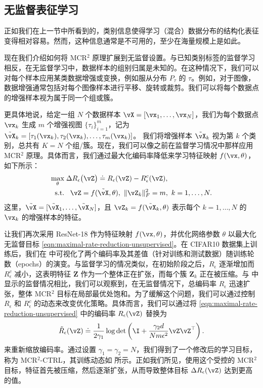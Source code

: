 \documentclass[../../book-main_zh.tex]{subfiles}
\begin{document}
\subsection{无监督表征学习}
\label{sec:SimDINO}

正如我们在上一节中所看到的，类别信息使得学习（混合）数据分布的结构化表征变得相对容易。然而，这种信息通常是不可用的，至少在海量规模上是如此。

现在我们介绍如何将 MCR$^2$ 原理扩展到无监督设置。与已知类别标签的监督学习相反，在无监督学习中，数据样本的组别归属是未知的。在这种情况下，我们可以对每个样本应用某类数据增强或变换，例如服从分布 $P_{\tau}$ 的 $\tau$。例如，对于图像，数据增强通常包括对每个图像样本进行平移、旋转或裁剪。我们可以将每个数据点的增强样本视为属于同一个组或簇。

更具体地说，给定一组 $N$ 个数据样本 $\vX =
[\vx_1,\dots,\vx_N]$，我们为每个数据点 $\vx_k$ 生成 $m$ 个增强视图
$\{\tau_i\}_{i=1}^m$，记为
$\tilde{\vX}_{k} = [\tau_1(\vx_k), \tau_2(\vx_k), \dots, \tau_m(\vx_k)]$。
我们将增强样本 $\tilde{\vX}_{k}$ 视为第 $k$ 个类别，总共有 $K=N$ 个组/簇。现在，我们可以像之前在监督学习情况中那样应用 MCR$^2$ 原理。具体而言，我们通过最大化编码率降低来学习特征映射 $f(\vx,\theta)$，如下所示：
\begin{equation}
    \begin{aligned}
        \max_{\theta } & \;  \Delta R_{\epsilon}\big(\vZ \big) \doteq
        R_{\epsilon}(\vZ) - R_{\epsilon}^c(\vZ ), \\
        \mbox{s.t.} & \ \ \, \vZ = f(\tilde{\vX}, \theta),\  \|\vZ_k\|_F^2
        = m,\ k=1,\dots,N.
    \end{aligned}
    \label{eqn:maximal-rate-reduction-unsupervised}
\end{equation}
这里，$\tilde{\vX} = [\tilde{\vX}_1,\dots,\tilde{\vX}_N]$，且 $\vZ_k =
f(\tilde{\vX}_k,\theta)$ 表示每个 $k=1,\dots,N$ 的 $\vx_k$ 的增强样本的特征。

让我们再次采用 ResNet-18 作为特征映射 $f(\vx,\theta)$，并优化网络参数 $\theta$ 以最大化无监督目标 \eqref{eqn:maximal-rate-reduction-unsupervised}。在 CIFAR10 数据集上训练后，我们在  中可视化了两个编码率及其差值（针对训练和测试数据）随训练轮数（epochs）的演变。与监督学习的情况类似，在初始阶段之后，$R_\epsilon$ 逐渐增加而 $R^c_\epsilon$ 减小，这表明特征 $\bm Z$ 作为一个整体正在扩张，而每个簇 $\bm Z_k$ 正在被压缩。与  中显示的监督情况相比，我们可以观察到，在无监督情况下，总编码率 $R_\epsilon$ 迅速扩张，整体 MCR$^2$ 目标在局部最优处饱和。为了缓解这个问题，我们可以通过控制 $R_\epsilon$ 和 $R^c_\epsilon$ 的动态来改变优化策略。具体而言，我们可以通过将 \eqref{eqn:maximal-rate-reduction-unsupervised} 中的编码率 $R_\epsilon(\vZ)$ 替换为
$$\tilde{R}_\epsilon(\vZ) \doteq \frac{1}{2\gamma_1} \log \det
\left(\I + \frac{\gamma_2 d}{N m \epsilon^{2}}\vZ \vZ ^{\top}\right).$$
来重新缩放编码率。通过设置 $\gamma_1 = \gamma_2 = N$，我们得到了一个修改后的学习目标，称为 MCR$^2$-{\scriptsize CTRL}，其训练动态如  所示。正如我们所见，使用这个受控的 MCR$^2$ 目标，特征首先被压缩，然后逐渐扩张，从而导致整体目标 $\Delta R_{\epsilon}(\vZ)$ 达到更高的值。
\end{document}
